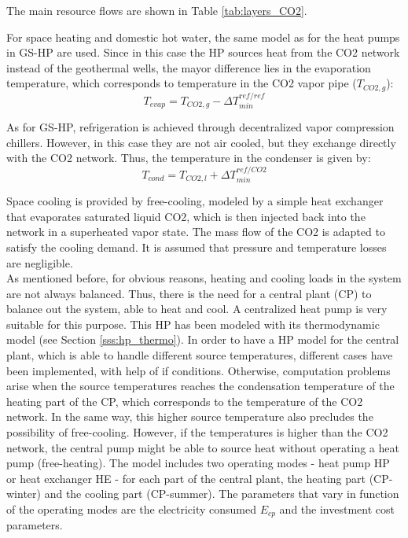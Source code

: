 \documentclass{article}
\begin{document}
The main resource flows are shown in Table \ref{tab:layers_CO2}.


For space heating and domestic hot water, the same model as for the heat pumps in GS-HP are used. Since in this case the HP sources heat from the CO2 network instead of the geothermal wells, the mayor difference lies in the evaporation temperature, which corresponds to temperature in the CO2 vapor pipe ($T_{CO2,g}$):
\begin{equation}
    T_{evap} = T_{CO2,g} - \Delta T_{min}^{ref/ref}
\end{equation}

As for GS-HP, refrigeration is achieved through decentralized vapor compression chillers. However, in this case they are not air cooled, but they exchange directly with the CO2 network. Thus, the temperature in the condenser is given by:
\begin{equation}
    T_{cond} = T_{CO2,l} + \Delta T_{min}^{ref/CO2}
\end{equation}

Space cooling is provided by free-cooling, modeled by a simple heat exchanger that evaporates saturated liquid CO2, which is then injected back into the network in a superheated vapor state. The mass flow of the CO2 is adapted to satisfy the cooling demand. It is assumed that pressure and temperature losses are negligible.\\

As mentioned before, for obvious reasons, heating and cooling loads in the system are not always balanced. Thus, there is the need for a central plant (CP) to balance out the system, able to heat and cool. A centralized heat pump is very suitable for this purpose. This HP has been modeled with its thermodynamic model (see Section \ref{sss:hp_thermo}).
In order to have a HP model for the central plant, which is able to handle different source temperatures, different cases have been implemented, with help of if conditions. Otherwise, computation problems arise when the source temperatures reaches the condensation temperature of the heating part of the CP, which corresponds to the temperature of the CO2 network. In the same way, this higher source temperature also precludes the possibility of free-cooling. However, if the temperatures is higher than the CO2 network, the central pump might be able to source heat without operating a heat pump (free-heating). The model includes two operating modes - heat pump HP or heat exchanger HE - for each part of the central plant, the heating part (CP-winter) and the cooling part (CP-summer). The parameters that vary in function of the operating modes are the electricity consumed $E_{cp}$ and the investment cost parameters. 
\end{document}

